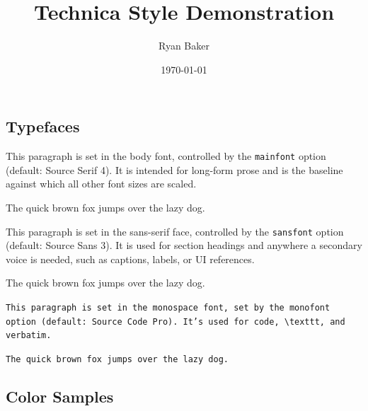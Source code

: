 \documentclass{article}
\title{Technica Style Demonstration}
\author{Ryan Baker}
\date{\today}
\begin{document}
\maketitle

\subsection{Typefaces}

This paragraph is set in the body font, controlled by the \texttt{mainfont} option (default: Source Serif 4).
It is intended for long-form prose and is the baseline against which all other font sizes are scaled.

\begin{center}
    \Large The quick brown fox jumps over the lazy dog.
\end{center}

{\technicaheadingfamily
This paragraph is set in the sans-serif face, controlled by the \texttt{sansfont} option (default: Source Sans 3).
It is used for section headings and anywhere a secondary voice is needed, such as captions, labels, or UI references.
}

\begin{center}
    \technicaheadingfamily\Large The quick brown fox jumps over the lazy dog.
\end{center}

\texttt{This paragraph is set in the monospace font, set by the monofont option (default: Source Code Pro). It's used for code, \textbackslash texttt, and verbatim.}

\begin{center}
    \Large \texttt{The quick brown fox jumps over the lazy dog.}
\end{center}

\subsection{Color Samples}
\end{document}
